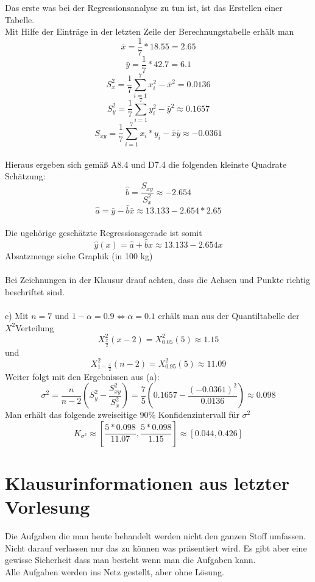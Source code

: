 \documentclass[10pt,a4paper]{article}
\begin{document}
Das erste was bei der Regressionsanalyse zu tun ist, ist das Erstellen einer Tabelle.\\
Mit Hilfe der Einträge in der letzten Zeile der Berechnungstabelle erhält man $$\bar{x} = \frac{1}{7}* 18.55=2.65$$ $$\bar{y}= \frac{1}{7}*42.7 = 6.1$$ 
$$S^2_x = \frac{1}{7}\sum_{i=1}^{7}x^2_i-\bar{x}^2 = 0.0136$$ 
$$S^2_y =\frac{1}{7}\sum_{i=1}^{7}y^2_i-\bar{y}^2\approx 0.1657$$
$$S_{xy} = \frac{1}{7}\sum_{i=1}^{7}x_i*y_i-\bar{x}\bar{y}\approx -0.0361$$\\
Hieraus ergeben sich gemäß A8.4 und D7.4 die folgenden kleinste Quadrate Schätzung:\\
$$\hat{b} = \frac{S_{xy}}{S^2_x} \approx -2.654$$
$$\hat{a} = \bar{y}-\hat{b}\bar{x}\approx13.133-2.654*2.65$$\\
Die ugehörige geschätzte Regressionsgerade ist somit 
$$\hat{y}(x)=\hat{a}+\hat{b}x\approx13.133-2.654x$$
Absatzmenge siehe Graphik (in 100 kg)\\~\\
Bei Zeichnungen in der Klausur drauf achten, dass die Achsen und Punkte richtig beschriftet sind.
\\~\\
c)
Mit $n=7$ und $1-\alpha = 0.9 \Leftrightarrow \alpha=0.1$ erhält man aus der Quantiltabelle der $X^2$Verteilung 
$$X^2_{\frac{x}{2}}(x-2)=X^2_{0.05}(5)\approx 1.15 $$ und 
$$X^2_{1-\frac{x}{2}}(n-2)=X^2_{0.95}(5)\approx11.09$$
Weiter folgt mit den Ergebnissen aus (a): 
$$\sigma^2 = \frac{n}{n-2}(S^2_y-\frac{S^2_{xy}}{S^2_x})=\frac{7}{5}(0.1657-\frac{(-0.0361)^2}{0.0136})\approx0.098$$
Man erhält das folgende zweiseitige 90\% Konfidenzintervall für $\sigma^2$ 
$$K_{\sigma^2}\approx[\frac{5*0.098}{11.07},\frac{5*0.098}{1.15}]\approx[0.044,0.426]$$
\section{Klausurinformationen aus letzter Vorlesung}
Die Aufgaben die man heute behandelt werden nicht den ganzen Stoff umfassen. Nicht darauf verlassen nur das zu können was präsentiert wird. Es gibt aber eine gewisse Sicherheit dass man besteht wenn man die Aufgaben kann.\\
Alle Aufgaben werden ins Netz gestellt, aber ohne Lösung.
\end{document}
